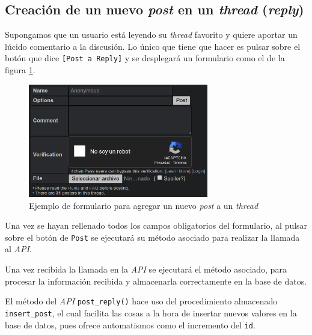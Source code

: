 \documentclass[12pt,a4paper,titlepage]{article}
\begin{document}

    \subsection{Creación de un nuevo \textit{post} en un \textit{thread} (\textit{reply})}

    Supongamos que un usuario está leyendo su \textit{thread} favorito y quiere aportar un lúcido comentario a la discusión. Lo único que tiene que hacer es pulsar sobre el botón que dice \texttt{[Post a Reply]} y se desplegará un formulario como el de la figura \ref{dcahn:new:post}.

    \begin{figure}[ht]
        \centering
        \caption{Ejemplo de formulario para agregar un nuevo \textit{post} a un \textit{thread}}\bigskip
        \label{dcahn:new:post}
        \includegraphics[width=0.7\textwidth]{media/4chan-reply-to-thread.png}
    \end{figure}

    Una vez se hayan rellenado todos los campos obligatorios del formulario, al pulsar sobre el botón de \texttt{Post} se ejecutará su método asociado para realizar la llamada al \textit{API}.

    

    Una vez recibida la llamada en la \textit{API} se ejecutará el método asociado, para procesar la información recibida y almacenarla correctamente en la base de datos.

    

    El método del \textit{API} \texttt{post\_reply()} hace uso del procedimiento almacenado \texttt{insert\_post}, el cual facilita las cosas a la hora de insertar nuevos valores en la base de datos, pues ofrece automatismos como el incremento del \texttt{id}.
\end{document}
